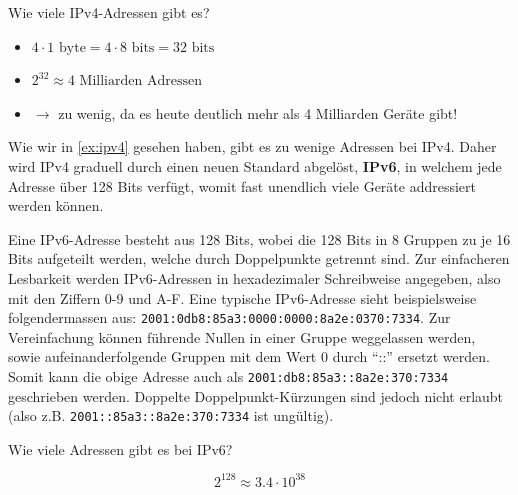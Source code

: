 \begin{myexercise}\label{ex:ipv4}
	Wie viele \gls{IP}v4-Adressen gibt es?
	\begin{myanswer}
		\begin{itemize}
			\item $4\cdot 1 \text{ byte} = 4\cdot 8 \text{ bits} = 32 \text{ bits}$
			\item $2^{32} \approx 4 \text{ Milliarden Adressen}$
			\item $\rightarrow$ zu wenig, da es heute deutlich mehr als 4 Milliarden Geräte gibt!
		\end{itemize}
	\end{myanswer}
\end{myexercise}
Wie wir in \cref{ex:ipv4} gesehen haben, gibt es zu wenige Adressen bei \gls{IP}v4. Daher wird \gls{IP}v4 graduell durch einen neuen Standard abgelöst, \textbf{\gls{IP}v6}, in welchem jede Adresse über 128 Bits verfügt, womit fast unendlich viele Geräte addressiert werden können.

\begin{mydefinition}
Eine \gls{IP}v6-Adresse besteht aus 128 Bits, wobei die 128 Bits in 8 Gruppen zu je 16 Bits aufgeteilt werden, welche durch Doppelpunkte getrennt sind. Zur einfacheren Lesbarkeit werden \gls{IP}v6-Adressen in hexadezimaler Schreibweise angegeben, also mit den Ziffern 0-9 und A-F. Eine typische \gls{IP}v6-Adresse sieht beispielsweise folgendermassen aus: \texttt{2001:0db8:85a3:0000:0000:8a2e:0370:7334}. Zur Vereinfachung können führende Nullen in einer Gruppe weggelassen werden, sowie aufeinanderfolgende Gruppen mit dem Wert 0 durch \enquote{::} ersetzt werden. Somit kann die obige Adresse auch als \texttt{2001:db8:85a3::8a2e:370:7334} geschrieben werden. Doppelte Doppelpunkt-Kürzungen sind jedoch nicht erlaubt (also z.B. \texttt{2001::85a3::8a2e:370:7334} ist ungültig).
\end{mydefinition}

\begin{myexercise}
	Wie viele Adressen gibt es bei IPv6?
	\begin{myanswer}
		\[2^{128} \approx 3.4\cdot 10^{38}\]
	\end{myanswer}
\end{myexercise}

